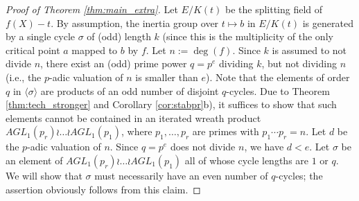 \documentclass[a4paper]{amsart}
\begin{document}
  
  \begin{proof}[Proof of Theorem \ref{thm:main_extra}]
  Let $E/K(t)$ be the splitting field of $f(X)-t$. By assumption, the inertia group over $t\mapsto b$ in $E/K(t)$ is generated by a single cycle $\sigma$ of (odd) length $k$ (since this is the multiplicity of the only critical point $a$ mapped to $b$ by $f$. Let $n:=\deg(f)$. Since $k$ is assumed to not divide $n$, there exist an (odd) prime power $q=p^e$ dividing $k$, but not dividing $n$ (i.e., the $p$-adic valuation of $n$ is smaller than $e$). Note that the elements of order $q$ in $\langle \sigma \rangle$ are products of an odd number of disjoint $q$-cycles.
  Due to Theorem \ref{thm:tech_stronger} and Corollary \ref{cor:stabpr}b),
   it suffices to show that  such elements cannot be contained in an iterated wreath product $AGL_1(p_r)\wr\dots\wr AGL_1(p_1)$, where $p_1,\dots, p_r$ are primes with $p_1\cdots p_r=n$. Let $d$ be the $p$-adic valuation of $n$. Since $q=p^e$ does not divide $n$, we have $d<e$. Let $\sigma$ be an element of $AGL_1(p_{r})\wr\dots\wr AGL_1(p_1)$ all of whose cycle lengths are $1$ or $q$. We will show that $\sigma$ must necessarily have an even number of $q$-cycles; the assertion obviously follows from this claim. %
  

\end{proof}
\end{document}
